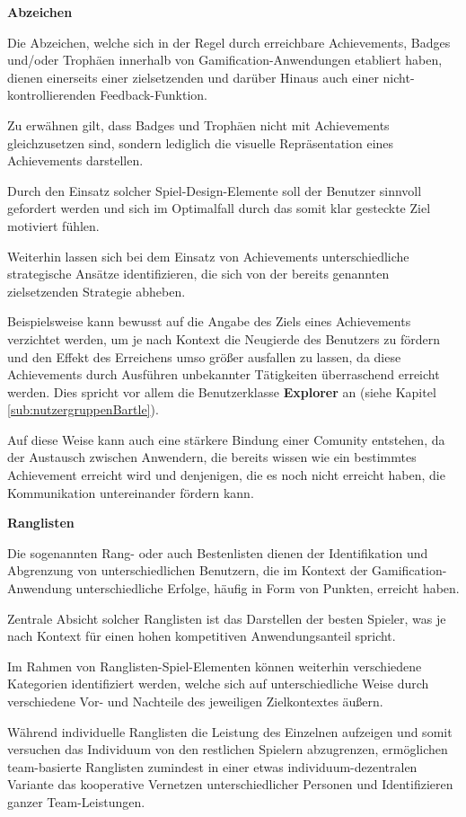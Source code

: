 \documentclass[bibliography=totoc,listof=totoc,BCOR=5mm,DIV=12,oneside]{scrbook}
\begin{document}
\par \bigskip \textbf{Abzeichen}
\par Die Abzeichen, welche sich in der Regel durch erreichbare Achievements, Badges und/oder Trophäen innerhalb von Gamification-Anwendungen etabliert haben, dienen einerseits einer zielsetzenden und darüber Hinaus auch einer nicht-kontrollierenden Feedback-Funktion. 
\par Zu erwähnen gilt, dass Badges und Trophäen nicht mit Achievements gleichzusetzen sind, sondern lediglich die visuelle Repräsentation eines Achievements darstellen.
\par Durch den Einsatz solcher Spiel-Design-Elemente soll der Benutzer sinnvoll gefordert werden und sich im Optimalfall durch das somit klar gesteckte Ziel motiviert fühlen.
\par \medskip Weiterhin lassen sich bei dem Einsatz von Achievements unterschiedliche strategische Ansätze identifizieren, die sich von der bereits genannten zielsetzenden Strategie abheben. 
\par Beispielsweise kann bewusst auf die Angabe des Ziels eines Achievements verzichtet werden, um je nach Kontext die Neugierde des Benutzers zu fördern und den Effekt des Erreichens umso größer ausfallen zu lassen, da diese Achievements durch Ausführen unbekannter Tätigkeiten überraschend erreicht werden. Dies spricht vor allem die Benutzerklasse \textbf{Explorer} an (siehe Kapitel \ref{sub:nutzergruppenBartle}). 
\par Auf diese Weise kann auch eine stärkere Bindung einer Comunity entstehen, da der Austausch zwischen Anwendern, die bereits wissen wie ein bestimmtes Achievement erreicht wird und denjenigen, die es noch nicht erreicht haben, die Kommunikation untereinander fördern kann.

\par \bigskip \textbf{Ranglisten}
\par Die sogenannten Rang- oder auch Bestenlisten dienen der Identifikation und Abgrenzung von unterschiedlichen Benutzern, die im Kontext der Gamification-Anwendung unterschiedliche Erfolge, häufig in Form von Punkten, erreicht haben.
\par Zentrale Absicht solcher Ranglisten ist das Darstellen der besten Spieler, was je nach Kontext für einen hohen kompetitiven Anwendungsanteil spricht.

\par \medskip Im Rahmen von Ranglisten-Spiel-Elementen können weiterhin verschiedene Kategorien identifiziert werden, welche sich auf unterschiedliche Weise durch verschiedene Vor- und Nachteile des jeweiligen Zielkontextes äußern.
\par Während individuelle Ranglisten die Leistung des Einzelnen aufzeigen und somit versuchen das Individuum von den restlichen Spielern abzugrenzen, ermöglichen team-basierte Ranglisten zumindest in einer etwas individuum-dezentralen Variante das kooperative Vernetzen unterschiedlicher Personen und Identifizieren ganzer Team-Leistungen.
\end{document}
